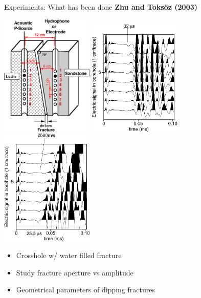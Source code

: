 \documentclass[utf8]{beamer} \usetheme{lfcr} %
\begin{document}
\begin{frame}{Experiments: What has been done}
  {\textbf{Zhu and Toksöz (2003)}}

  \includegraphics[width=0.3315\textwidth]{Zhu_and_Toksoz_a_fig3}%
  \includegraphics[width=0.3315\textwidth]{Zhu_and_Toksoz_a_fig1}%
  \includegraphics[width=0.3315\textwidth]{Zhu_and_Toksoz_a_fig2}%

  \begin{itemize}
    \item Crosshole w/ water filled fracture
    \item Study fracture aperture vs amplitude
    \item Geometrical parameters of dipping fractures
  \end{itemize}

\end{frame}
%
\end{document}
